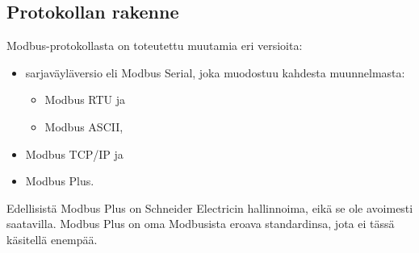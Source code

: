   \subsection{Protokollan rakenne}\label{sec:rakenne}

    Modbus-protokollasta on toteutettu muutamia eri versioita:
    \begin{itemize}
      \item sarjaväyläversio eli Modbus Serial, joka muodostuu kahdesta muunnelmasta:
      \begin{itemize}
        \item Modbus \gls{RTU} ja
        \item Modbus ASCII,
      \end{itemize}
      \item Modbus TCP/IP ja
      \item Modbus Plus.
      \parencite{modbusAppSpec}
    \end{itemize}
    Edellisistä Modbus Plus on Schneider Electricin hallinnoima, eikä se ole avoimesti saatavilla. Modbus Plus on oma Modbusista eroava standardinsa, jota ei tässä käsitellä enempää. \parencite{seCom}

